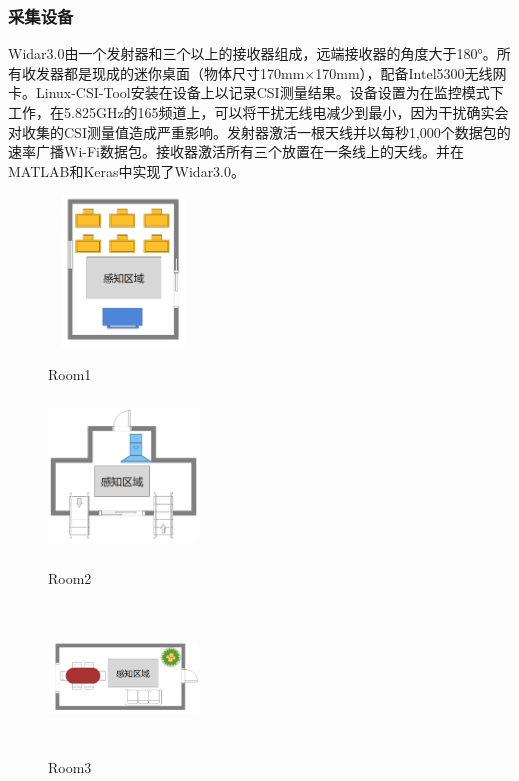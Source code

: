\documentclass[a4paper]{article}
\begin{document}
  \subsubsection{采集设备}
  Widar3.0由一个发射器和三个以上的接收器组成，远端接收器的角度大于180°。所有收发器都是现成的迷你桌面（物体尺寸170mm×170mm），配备Intel5300无线网卡。Linux-CSI-Tool安装在设备上以记录CSI测量结果。设备设置为在监控模式下工作，在5.825GHz的165频道上，可以将干扰无线电减少到最小，因为干扰确实会对收集的CSI测量值造成严重影响。发射器激活一根天线并以每秒1,000个数据包的速率广播Wi-Fi数据包。接收器激活所有三个放置在一条线上的天线。并在MATLAB和Keras中实现了Widar3.0\citep{core}。 \par
   \begin{figure}[H]
	\centering
	\begin{minipage}{0.3\linewidth}
		\centering
		\includegraphics[width=4cm,height=4cm]{images/Room1.png}
		\caption{Room1}
		\label{fig1}
              \end{minipage}
	\begin{minipage}{0.3\linewidth}
		\centering
		\includegraphics[width=4cm,height=4cm]{images/Room2.png}
		\caption{Room2}
		\label{fig1}
              \end{minipage}
              \begin{minipage}{0.3\linewidth}
                \centering
                \includegraphics[width=4cm,height=4cm]{images/Room3.png}
                \caption{Room3}
                \label{fig1}
              \end{minipage} 
      \end{figure}
\end{document}

